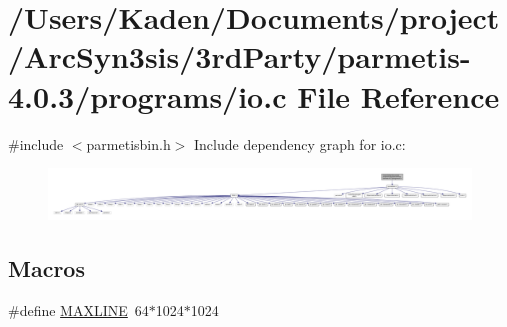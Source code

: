 \hypertarget{a00861}{}\section{/\+Users/\+Kaden/\+Documents/project/\+Arc\+Syn3sis/3rd\+Party/parmetis-\/4.0.3/programs/io.c File Reference}
\label{a00861}
{\ttfamily \#include $<$parmetisbin.\+h$>$}\newline
Include dependency graph for io.\+c\+:\nopagebreak
\begin{figure}[H]
\begin{center}
\leavevmode
\includegraphics[width=350pt]{a00862}
\end{center}
\end{figure}
\subsection*{Macros}
\begin{DoxyCompactItemize}
\item 
\#define \hyperlink{a00861_a3e937c42922f7601edb17b747602c471}{M\+A\+X\+L\+I\+NE}~64$\ast$1024$\ast$1024
\end{DoxyCompactItemize}
